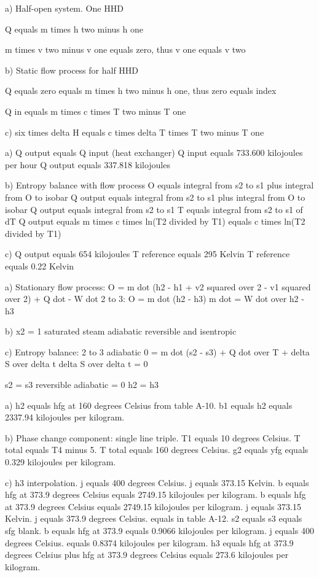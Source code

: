 a) Half-open system. One HHD

Q equals m times h two minus h one

m times v two minus v one equals zero, thus v one equals v two

b) Static flow process for half HHD

Q equals zero equals m times h two minus h one, thus zero equals index

Q in equals m times c times T two minus T one

c) six times delta H equals c times delta T times T two minus T one

a) Q output equals Q input (heat exchanger)
Q input equals 733.600 kilojoules per hour
Q output equals 337.818 kilojoules

b) Entropy balance with flow process
O equals integral from s2 to s1 plus integral from O to isobar
Q output equals integral from s2 to s1 plus integral from O to isobar
Q output equals integral from s2 to s1
T equals integral from s2 to s1 of dT
Q output equals m times c times ln(T2 divided by T1)
equals c times ln(T2 divided by T1)

c) Q output equals 654 kilojoules
T reference equals 295 Kelvin
T reference equals 0.22 Kelvin

a) Stationary flow process:  
O = m dot (h2 - h1 + v2 squared over 2 - v1 squared over 2) + Q dot - W dot  
2 to 3: O = m dot (h2 - h3)  
m dot = W dot over h2 - h3  

b) x2 = 1 saturated steam  
adiabatic reversible and isentropic  

c) Entropy balance: 2 to 3 adiabatic  
0 = m dot (s2 - s3) + Q dot over T + delta S over delta t  
delta S over delta t = 0  

s2 = s3 reversible adiabatic = 0  
h2 = h3

a) h2 equals hfg at 160 degrees Celsius from table A-10. b1 equals h2 equals 2337.94 kilojoules per kilogram.

b) Phase change component: single line triple. T1 equals 10 degrees Celsius. T total equals T4 minus 5. T total equals 160 degrees Celsius. g2 equals yfg equals 0.329 kilojoules per kilogram.

c) h3 interpolation. j equals 400 degrees Celsius. j equals 373.15 Kelvin. b equals hfg at 373.9 degrees Celsius equals 2749.15 kilojoules per kilogram. b equals hfg at 373.9 degrees Celsius equals 2749.15 kilojoules per kilogram. j equals 373.15 Kelvin. j equals 373.9 degrees Celsius. equals in table A-12. s2 equals s3 equals sfg blank. b equals hfg at 373.9 equals 0.9066 kilojoules per kilogram. j equals 400 degrees Celsius. equals 0.8374 kilojoules per kilogram. h3 equals hfg at 373.9 degrees Celsius plus hfg at 373.9 degrees Celsius equals 273.6 kilojoules per kilogram.